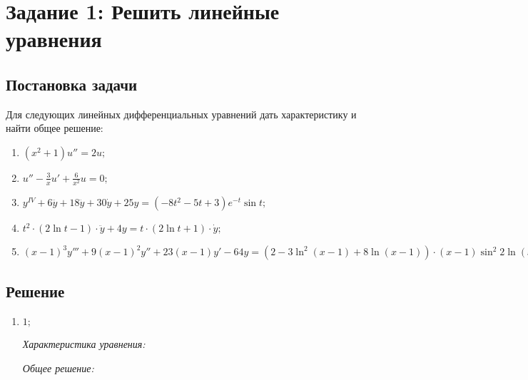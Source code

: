\section{Задание 1: Решить линейные уравнения}
    \subsection{Постановка задачи}
        Для следующих линейных дифференциальных уравнений дать характеристику и найти общее решение:

        \begin{enumerate}
            \item \( \left( x^2 + 1 \right) u'' = 2u; \)
            \item \( u'' - \frac{3}{x}u' + \frac{6}{x^2}u = 0; \)
            \item \( y^{IV} + 6 \dddot{y} + 18 \ddot{y} + 30 \dot{y} + 25 y = \left( -8t^2 - 5t + 3 \right) e^{-t} \sin{t}; \)
            \item \( t^2 \cdot \left( 2 \ln{t} - 1 \right) \cdot \ddot{y} + 4y = t \cdot \left( 2\ln{t} + 1 \right) \cdot \dot{y}; \)
            \item \( (x-1)^3 y''' + 9 (x-1)^2 y'' + 23(x-1)y' - 64y = \left( 2 - 3\ln^2(x-1)  + 8\ln(x-1) \right) \cdot (x-1) \sin^2 2\ln(x-1). \)
        \end{enumerate}

    
    \subsection{Решение}
        \begin{enumerate}
            \item \( 1; \)
            
                \textit{Характеристика уравнения:}

                
                \textit{Общее решение:}
            

        \end{enumerate}